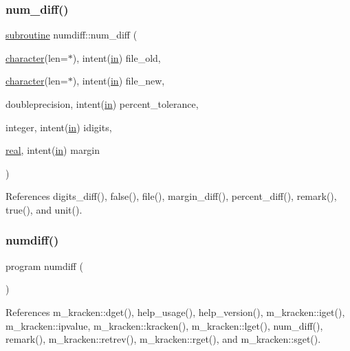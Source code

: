 \subsubsection{\texorpdfstring{num\+\_\+diff()}{num\_diff()}}
{\footnotesize\ttfamily \hyperlink{M__stopwatch_83_8txt_acfbcff50169d691ff02d4a123ed70482}{subroutine} numdiff\+::num\+\_\+diff (\begin{DoxyParamCaption}\item[{\hyperlink{option__stopwatch_83_8txt_abd4b21fbbd175834027b5224bfe97e66}{character}(len=$\ast$), intent(\hyperlink{M__journal_83_8txt_afce72651d1eed785a2132bee863b2f38}{in})}]{file\+\_\+old,  }\item[{\hyperlink{option__stopwatch_83_8txt_abd4b21fbbd175834027b5224bfe97e66}{character}(len=$\ast$), intent(\hyperlink{M__journal_83_8txt_afce72651d1eed785a2132bee863b2f38}{in})}]{file\+\_\+new,  }\item[{doubleprecision, intent(\hyperlink{M__journal_83_8txt_afce72651d1eed785a2132bee863b2f38}{in})}]{percent\+\_\+tolerance,  }\item[{integer, intent(\hyperlink{M__journal_83_8txt_afce72651d1eed785a2132bee863b2f38}{in})}]{idigits,  }\item[{\hyperlink{read__watch_83_8txt_abdb62bde002f38ef75f810d3a905a823}{real}, intent(\hyperlink{M__journal_83_8txt_afce72651d1eed785a2132bee863b2f38}{in})}]{margin }\end{DoxyParamCaption})}



References digits\+\_\+diff(), false(), file(), margin\+\_\+diff(), percent\+\_\+diff(), remark(), true(), and unit().

\mbox{\label{numdiff_8f90_a5af23474c4d2e32d7426907cf2536366}} 
\subsubsection{\texorpdfstring{numdiff()}{numdiff()}}
{\footnotesize\ttfamily program numdiff (\begin{DoxyParamCaption}{ }\end{DoxyParamCaption})}



References m\+\_\+kracken\+::dget(), help\+\_\+usage(), help\+\_\+version(), m\+\_\+kracken\+::iget(), m\+\_\+kracken\+::ipvalue, m\+\_\+kracken\+::kracken(), m\+\_\+kracken\+::lget(), num\+\_\+diff(), remark(), m\+\_\+kracken\+::retrev(), m\+\_\+kracken\+::rget(), and m\+\_\+kracken\+::sget().

